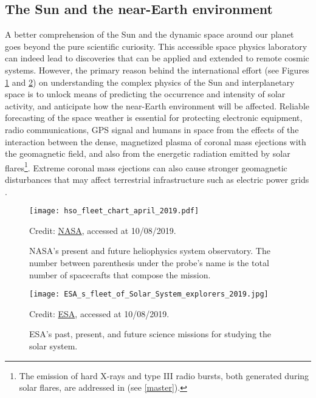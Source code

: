 \documentclass[12pt,a4paper,ruledheader]{report}
\begin{document}
\begin{appendix}
\subsection{The Sun and the near-Earth environment}
\label{sec:sun}
A better comprehension of the Sun and the dynamic space around our planet
goes beyond the pure scientific curiosity. This accessible space physics
laboratory can indeed lead to discoveries that can be applied and extended
to remote cosmic systems. However, the primary reason behind the international
effort (see Figures \ref{nasa} and
\ref{esa}) on understanding the complex physics of the Sun and interplanetary
space is to unlock means of predicting the occurrence and intensity of solar
activity, and anticipate how the near-Earth environment will be affected.
Reliable forecasting of the space weather is essential for protecting
electronic equipment, radio communications, GPS signal and humans in space
from the effects of the interaction between the dense, magnetized plasma of
coronal mass ejections with the geomagnetic field, and also from the
energetic radiation emitted by solar flares\footnote{The emission of hard X-rays
  and type III radio bursts, both generated during solar flares, are addressed in
  \cite{Tigik2016a} (see \autoref{master}).}. Extreme coronal mass ejections
can also cause stronger geomagnetic disturbances that may affect terrestrial
infrastructure such as electric power grids \cite{NAP13060}.
\begin{figure}[hb]
  \begin{center}
    \texttt{[image: hso\_fleet\_chart\_april\_2019.pdf]}
    \caption{NASA's present and future heliophysics system observatory. The number
      between parenthesis under the probe's name is the total number of spacecrafts
      that compose the mission.}
      {\footnotesize Credit:}
      \href{https://science.nasa.gov/heliophysics}
      {\footnotesize NASA}{\footnotesize , accessed at 10/08/2019.}
    \label{nasa}
  \end{center}
\end{figure}
\begin{figure}[ht]
  \begin{center}
    \texttt{[image: ESA\_s\_fleet\_of\_Solar\_System\_explorers\_2019.jpg]}
    \caption{ESA's past, present, and future science missions for studying the solar system.}
      {\footnotesize Credit:}
      \href{https://www.esa.int/spaceinimages/Images/2019/02/ESA_s_fleet_of_Solar_System_explorers}
      {\footnotesize ESA}{\footnotesize , accessed at 10/08/2019.}
    \label{esa}
  \end{center}
\end{figure}


\end{appendix}
\end{document}
